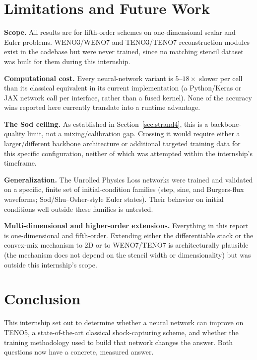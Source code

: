 \documentclass[11pt]{article}
\begin{document}
\section{Limitations and Future Work}

\textbf{Scope.} All results are for fifth-order schemes on
one-dimensional scalar and Euler problems. WENO3/WENO7 and TENO3/TENO7
reconstruction modules exist in the codebase but were never trained, since
no matching stencil dataset was built for them during this internship.

\textbf{Computational cost.} Every neural-network variant is
$5$--$18\times$ slower per cell than its classical equivalent in its
current implementation (a Python/Keras or JAX network call per interface,
rather than a fused kernel). None of the accuracy wins reported here
currently translate into a runtime advantage.

\textbf{The Sod ceiling.} As established in Section~\ref{sec:strand4},
this is a backbone-quality limit, not a mixing/calibration gap. Crossing
it would require either a larger/different backbone architecture or
additional targeted training data for this specific configuration, neither
of which was attempted within the internship's timeframe.

\textbf{Generalization.} The Unrolled Physics Loss networks were trained
and validated on a specific, finite set of initial-condition families
(step, sine, and Burgers-flux waveforms; Sod/Shu--Osher-style Euler
states). Their behavior on initial conditions well outside these families
is untested.

\textbf{Multi-dimensional and higher-order extensions.} Everything in this
report is one-dimensional and fifth-order. Extending either the
differentiable stack or the convex-mix mechanism to 2D or to WENO7/TENO7
is architecturally plausible (the mechanism does not depend on the
stencil width or dimensionality) but was outside this internship's scope.

\section{Conclusion}

This internship set out to determine whether a neural network can improve
on TENO5, a state-of-the-art classical shock-capturing scheme, and whether
the training methodology used to build that network changes the answer.
Both questions now have a concrete, measured answer.
\end{document}
